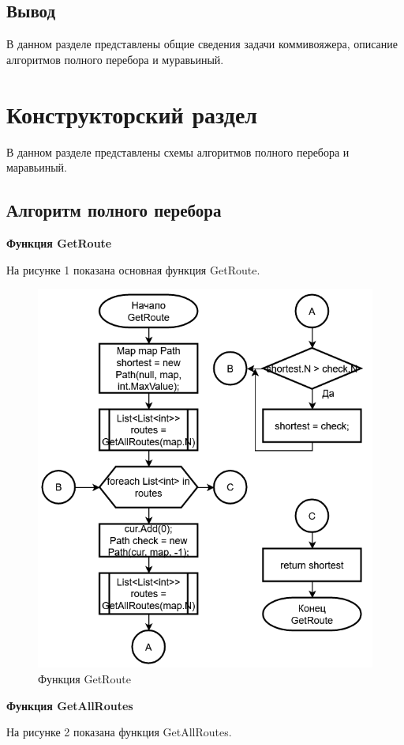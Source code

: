 \documentclass[14pt, a4paper]{extarticle}
\begin{document}
\subsection{Вывод}
В данном разделе представлены общие сведения задачи коммивояжера, описание алгоритмов полного перебора и муравьиный.

\clearpage
\section{Конструкторский раздел}
В данном разделе представлены схемы алгоритмов полного перебора и маравьиный.
\subsection{Алгоритм полного перебора}
\textbf{Функция GetRoute}\par
На рисунке 1 показана основная функция GetRoute.
\begin{figure}[h!]
	\centering
	\includegraphics[scale=1]{source/GetRoute.png}
	\caption{Функция GetRoute}
\end{figure}	
\newpage
\textbf{Функция GetAllRoutes}\par
На рисунке 2 показана функция GetAllRoutes.
\end{document}
